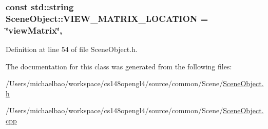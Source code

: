 \subsubsection[{V\+I\+E\+W\+\_\+\+M\+A\+T\+R\+I\+X\+\_\+\+L\+O\+C\+A\+T\+I\+O\+N}]{\setlength{\rightskip}{0pt plus 5cm}const std\+::string Scene\+Object\+::\+V\+I\+E\+W\+\_\+\+M\+A\+T\+R\+I\+X\+\_\+\+L\+O\+C\+A\+T\+I\+O\+N = \char`\"{}view\+Matrix\char`\"{}\hspace{0.3cm}{\ttfamily [static]}, {\ttfamily [protected]}}\label{class_scene_object_a1c129ecdd6bd8e2f34c713f5dd183361}


Definition at line 54 of file Scene\+Object.\+h.



The documentation for this class was generated from the following files\+:\begin{DoxyCompactItemize}
\item 
/\+Users/michaelbao/workspace/cs148opengl4/source/common/\+Scene/\hyperlink{_scene_object_8h}{Scene\+Object.\+h}\item 
/\+Users/michaelbao/workspace/cs148opengl4/source/common/\+Scene/\hyperlink{_scene_object_8cpp}{Scene\+Object.\+cpp}\end{DoxyCompactItemize}
